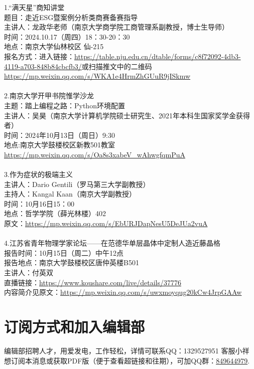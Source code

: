 \documentclass[letterpaper, 12pt]{article}
\begin{document}
\begin{multicols}{2}
1.“满天星”商知讲堂\\
题目：走近ESG暨案例分析类商赛备赛指导\\
主讲人：龙政华老师（南京大学商学院工商管理系副教授，博士生导师）\\
时间：2024.10.17（周四）18：30-20：30\\
地点：南京大学仙林校区 仙\uppercase\expandafter{}-215\\
报名方式：进入链接：\url{https://table.nju.edu.cn/dtable/forms/c8f72092-4db3-4119-a703-848b84cbcfb3/}或扫描推文中的二维码\\
\url{https://mp.weixin.qq.com/s/WKA1e4HrmZhGUuR9jISkmw}\\\\
2.南京大学开甲书院惟学沙龙\\
主题：踏上编程之路：Python环境配置\\
主讲人：吴昊（南京大学计算机学院硕士研究生、2021年本科生国家奖学金获得者）\\
时间：2024年10月13日（周日）9:30\\
地点:南京大学鼓楼校区新教501教室\\
\url{https://mp.weixin.qq.com/s/Oa8s3xabeV_wAhwgfqmPuA}\\\\
3.作为症状的极端主义\\
主讲人：Dario Gentili（罗马第三大学副教授）\\
主持人：Kangal Kaan（南京大学副教授）\\
时间：10月16日15：00\\
地点：哲学学院（薛光林楼）402\\
原文：\url{https://mp.weixin.qq.com/s/EbURJDapNesU5DeJUa2vuA}\\\\
4.江苏省青年物理学家论坛——在范德华单层晶体中定制人造近藤晶格\\
报告时间：10月15日（周二）中午12点\\
报告地点：南京大学鼓楼校区唐仲英楼B501\\
主讲人：付英双\\
直播链接：\url{https://www.koushare.com/live/details/37776}\\
内容简介见原文：\url{https://mp.weixin.qq.com/s/uwxmoyqug20kCw4JrpGAAw}\\
\section{订阅方式和加入编辑部}
编辑部招聘人才，用爱发电，工作轻松，详情可联系QQ：1329527951 客服小祥\\想订阅本消息或获取PDF版（便于查看超链接和往期），可加QQ群：\href{https://qm.qq.com/q/FGX1VYCrGS}{849644979}.

\end{multicols}
\end{document}
